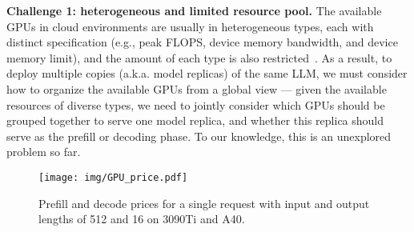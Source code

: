  
\noindent \textbf{{Challenge 1: heterogeneous and limited resource pool.}}
The available GPUs in cloud environments are usually in heterogeneous types, each with distinct specification (e.g., peak FLOPS, device memory bandwidth, and device memory limit), and the amount of each type is also restricted~\cite{skypilot,euromlsysworkshop}.
As a result, to deploy multiple copies (a.k.a. model replicas) of the same LLM, we must consider how to organize the available GPUs from a global view --- given the available resources of diverse types, we need to jointly consider which GPUs should be grouped together to serve one model replica, and whether this replica should serve as the prefill or decoding phase. To our knowledge, this is an unexplored problem so far.

\begin{figure}[!t]
  \centering
  \texttt{[image: img/GPU\_price.pdf]} %
  \vspace{-1em}
  \caption{\small{Prefill and decode prices for a single request with input and output lengths of 512 and 16 on 3090Ti and A40.}}
  \label{fig:a40}
  \vspace{-1em}
\end{figure}

